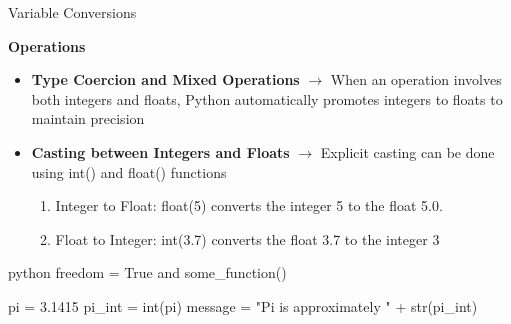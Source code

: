 \documentclass[
	11pt, 
]{beamer}
\begin{document}
\begin{frame}[fragile]{Variable Conversions}
    

\begin{alertblock}{\textbf{Operations}}
    \begin{itemize}
        \item \textbf{Type Coercion and Mixed Operations}  $\rightarrow$ When an operation involves both integers and floats, Python automatically promotes integers to floats to maintain precision
        \item \textbf{Casting between Integers and Floats} $\rightarrow$ Explicit casting can be done using int() and float() functions \smallskip

        \begin{enumerate}
            \item Integer to Float: float(5) converts the integer 5 to the float 5.0.
            \item Float to Integer: int(3.7) converts the float 3.7 to the integer 3
        \end{enumerate}
    \end{itemize}
\end{alertblock}

\begin{mintedbox}{python}
freedom = True and some_function()

pi = 3.1415
pi_int = int(pi)
message = "Pi is approximately " + str(pi_int)
\end{mintedbox}

\end{frame}
\end{document}
